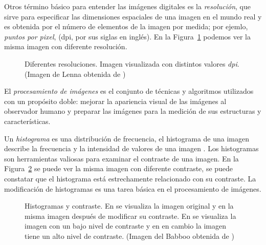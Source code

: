 Otros término básico para entender las imágenes digitales es la
\textit{resolución}, que sirve para especificar las dimensiones espaciales de
una imagen en el mundo real y es obtenida por el número de elementos de la
imagen por medida; por ejemlo, \textit{puntos por pixel}, (dpi, por sus siglas
en inglés). En la Figura~\ref{resolution} podemos ver la misma imagen con
diferente resolución.

\begin{figure}[h]
    \centering


  \caption[Resolución]{Diferentes resoluciones. Imagen visualizada con
  distintos valores \textit{dpi}. (Imagen de Lenna obtenida de \cite{sipi})}

  \label{resolution}
\end{figure}

El \textit{procesamiento de imágenes} es el conjunto de técnicas y algoritmos
utilizados con un propósito doble: mejorar la apariencia visual de las imágenes
al observador humano y preparar las imágenes para la medición de sus
estructuras y características.

Un \textit{histograma} es una distribución de frecuencia, el histograma de una
imagen describe la frecuencia y la intensidad de valores de una imagen
\cite{burger2008digital}. Los histogramas son herramientas valiosas para
examinar el contraste de una imagen. En la Figura~\ref{fig:histograms} se puede
ver la misma imagen con diferente contraste, se puede constatar que el
histograma está estrechamente relacionado con su contraste. La modificación de
histogramas es una tarea básica en el procesamiento de imágenes.

\begin{figure}[h]
    \centering


    \bigskip


  \caption[Histogramas y contraste]{Histogramas y contraste. En
  \protect{} se visualiza la imagen original y en
  \protect{} la misma imagen después de modificar su contraste. En
  \protect{} se visualiza la imagen con un bajo nivel de contraste
  y en \protect{} en cambio la imagen tiene un alto nivel de
  contraste. (Imagen del Babboo obtenida de \cite{sipi})}
  \label{fig:histograms}
\end{figure}

